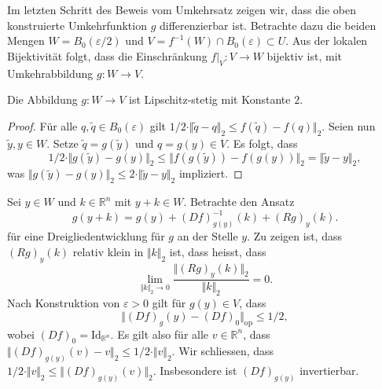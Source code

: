\documentclass[../main.tex]{subfiles}
\begin{document}
Im letzten Schritt des Beweis vom Umkehrsatz zeigen wir,
dass die oben konstruierte Umkehrfunktion $g$ differenzierbar ist.
Betrachte dazu die beiden Mengen $W = B_0(\varepsilon / 2)$ und
$V = f^{-1}(W) \cap B_0(\varepsilon) \subset U$.
Aus der lokalen Bijektivität folgt, dass die Einschränkung
$f|_{V} \colon V \to W$ bijektiv ist, mit Umkehrabbildung
$g \colon W \to V$.

\begin{claim}
  Die Abbildung $g \colon W \to V$ ist Lipschitz-stetig
  mit Konstante $2$.
\end{claim}

\begin{proof}
  Für alle $q, \widetilde q \in B_0(\varepsilon)$ gilt
  \(
    1/2 \cdot
    \Vert \widetilde q - q \Vert_2 \leq f(\widetilde q) - f(q) \Vert_2.
  \)
  Seien nun $\widetilde y, y \in W$. Setze
  $\widetilde q = g(\widetilde y)$
  und $q = g(y) \in V$.
  Es folgt, dass
  \[
    1/2 \cdot \Vert g(\widetilde y) - g(y) \Vert_2 \leq
    \Vert f(g(\widetilde y )) - f(g(y)) \Vert_2 = \Vert \widetilde y
    - y \Vert_2,
  \]
  was $\Vert g( \widetilde y ) - g(y) \Vert_2 \leq 2 \cdot \Vert \widetilde
  y - y \Vert_2$
  impliziert.
\end{proof}

Sei $y \in W$ und $k \in \mathbb{R}^n$ mit $y + k \in W$.
Betrachte den Ansatz
\[
  g(y + k ) = g(y) + {(Df)}_{g(y)}^{-1}(k) + {(Rg)}_{y}(k).
\]
für eine Dreigliedentwicklung für $g$ an der Stelle $y$.
Zu zeigen ist, dass ${(Rg)}_{y}(k)$ relativ klein in $\Vert k \Vert_2$ ist,
dass heisst, dass
\[
  \lim_{\Vert k \Vert_2 \to 0}
  \frac{\Vert {(Rg)}_y(k) \Vert_2}{\Vert k \Vert_2} = 0.
\]
Nach Konstruktion von $\varepsilon > 0$ gilt für
$g(y) \in V$, dass
\[
  \Vert {(Df)}_g(y) - {(Df)}_0 \Vert_{\text{op}} \leq 1/2,
\]
wobei ${(Df)}_0 = \text{Id}_{\mathbb{R}^n}$.
Es gilt also für alle $v \in \mathbb{R}^n$, dass
\(
  \Vert {(Df)}_{g(y)}(v) - v \Vert_2 \leq 1/2 \cdot \Vert v \Vert_2.
\)
Wir schliessen, dass $1/2 \cdot \Vert v \Vert_2 \leq \Vert
{(Df)}_{g(y)}(v) \Vert_2$.
Insbesondere ist ${(Df)}_{g(y)}$ invertierbar.
\end{document}
